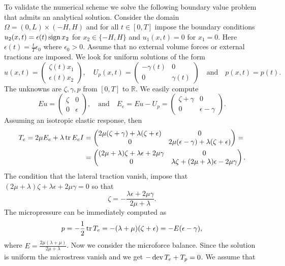 To validate the numerical scheme we solve the following boundary value problem that admits an analytical solution. Consider the domain $\Omega=(0,L)\times(-H,H)$ and for all $t\in[0,T]$ impose the boundary conditions $u_2(x,t)=\epsilon(t)\operatorname{sign} x_2$ for $x_2\in\{-H,H\}$ and $u_1(x,t)=0$ for $x_1=0$. Here $\epsilon(t)=\frac{t}{T}\epsilon_0$ where $\epsilon_0>0$. Assume that no external volume forces or external tractions are imposed. We look for uniform solutions of the form
\[
u(x,t)=\begin{pmatrix}
\zeta(t)x_1 \\
\epsilon(t)x_2
\end{pmatrix},\quad U_p(x,t)=\begin{pmatrix}
-\gamma(t) & 0 \\
0 & \gamma(t)
\end{pmatrix}\quad\text{and}\quad p(x,t)=p(t).
\]
The unknowns are $\zeta,\gamma,p$ from $[0,T]$ to $\mathbb{R}$. We easily compute
\[
Eu=\begin{pmatrix}
\zeta & 0 \\
0 & \epsilon
\end{pmatrix},
\quad\text{and}\quad
E_e=Eu-U_p=\begin{pmatrix}
\zeta+\gamma & 0 \\
0 & \epsilon-\gamma
\end{pmatrix}.
\]
Assuming an isotropic elastic response, then
\[
\begin{split}
T_e=2\mu E_e+\lambda\operatorname{tr} E_e I&=
\begin{pmatrix}
2\mu(\zeta+\gamma)+\lambda(\zeta+\epsilon) & 0 \\
0 & 2\mu(\epsilon-\gamma)+\lambda(\zeta+\epsilon)
\end{pmatrix}=\\
&=\begin{pmatrix}
(2\mu+\lambda)\zeta+\lambda\epsilon+2\mu\gamma & 0 \\
0 & \lambda\zeta+(2\mu+\lambda)\epsilon-2\mu\gamma
\end{pmatrix}.
\end{split}
\]
The condition that the lateral traction vanish, impose that $(2\mu+\lambda)\zeta+\lambda\epsilon+2\mu\gamma=0$ so that
\[
\zeta=-\frac{\lambda\epsilon+2\mu\gamma}{2\mu+\lambda}.
\]
The micropressure can be immediately computed as
\[
p=-\frac{1}{2}\operatorname{tr} T_e=-(\lambda+\mu)(\zeta+\epsilon)=-E(\epsilon-\gamma),
\]
where $E=\frac{2\mu(\lambda+\mu)}{2\mu+\lambda}$. Now we consider the microforce balance. Since the solution is uniform the microstress vanish and we get $-\operatorname{dev} T_e+T_p=0$. We assume that
